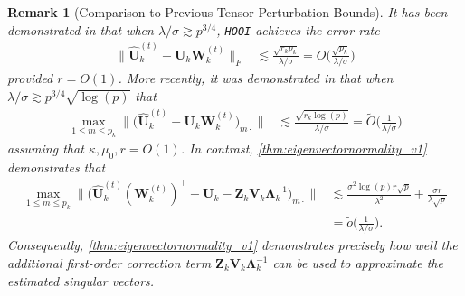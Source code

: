 \documentclass[10pt]{article}
\newcommand{\0}{{\mathbf{0}}}
\newcommand{\1}{{\mathbf{1}}}
\newcommand{\U}{{\mathbf{U}}}
\renewcommand{\citet}{\cite}
\renewcommand{\t}{^{\top}}
\newcommand{\uhat}{\mathbf{\hat{U}}}
\newtheorem{remark}{Remark}
\newcommand{\inv}{^{-1}}
\renewcommand{\tilde}{\widetilde}
\renewcommand{\hat}{\widehat}
\renewcommand{\hat}{\widehat}
\begin{document}
  \begin{remark}[Comparison to Previous Tensor Perturbation Bounds]
 It has been demonstrated in \citet{zhang_tensor_2018} that when $\lambda/\sigma \gtrsim p^{3/4}$, \texttt{HOOI} achieves the error rate
 \begin{align*}
     \| \uhat_k^{(t)}  - \U_k \mathbf{W}_k^{(t)} \|_F &\lesssim \frac{\sqrt{r_k p_k}}{\lambda/\sigma} =  O\bigg( \frac{\sqrt{p_k}}{\lambda/\sigma}\bigg)
 \end{align*}
 provided $r = O(1)$.   More recently, it was demonstrated in \citet{agterberg_estimating_2022} that when $\lambda/\sigma \gtrsim p^{3/4} \sqrt{\log(p)}$ that
 \begin{align*}
     \max_{1\leq m\leq p_k} \| \big(\uhat_k^{(t)}  - \U_k \mathbf{W}_k^{(t)} \big)_{m\cdot} \| &\lesssim \frac{\sqrt{r_k \log(p)}}{\lambda/\sigma} = \tilde O\bigg( \frac{1}{\lambda/\sigma} \bigg)
 \end{align*}
 assuming that $\kappa,\mu_0, r = O(1)$. In contrast, \cref{thm:eigenvectornormality_v1} demonstrates that
 \begin{align*}
\max_{1\leq m\leq p_k}\bigg\| \bigg(     \uhat_k^{(t)}( \mathbf{W}_k^{(t)})\t - \U_k - \mathbf{Z}_k \mathbf{V}_k \mathbf{\Lambda}_k\inv \bigg)_{m\cdot}\bigg\| &\lesssim \frac{\sigma^2 \log(p) r\sqrt{p}}{\lambda^2} + \frac{\sigma r }{\lambda \sqrt{p}}\\&= \tilde o \bigg( \frac{1}{\lambda/\sigma} \bigg).
 \end{align*}
 Consequently, \cref{thm:eigenvectornormality_v1} demonstrates precisely how well the additional first-order correction term $\mathbf{Z}_k \mathbf{V}_k \mathbf{\Lambda}_k\inv$ can be used to approximate the estimated singular vectors.  
 \end{remark}
 
\end{document}
